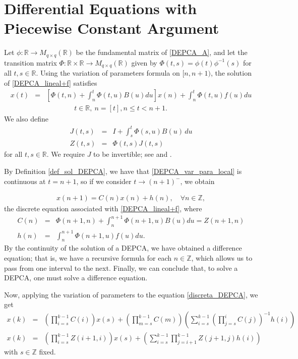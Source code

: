\documentclass[english,,reqno]{amsart}
\numberwithin{equation}{section}
\theoremstyle{plain}
\theoremstyle{definition}
\theoremstyle{remark}
\begin{document}
\section{Differential Equations with Piecewise Constant Argument}\label{sec3}

Let $\phi:\mathbb{R}\rightarrow M_{q\times q}(\mathbb{R})$ be the fundamental matrix of \eqref{DEPCA_A}, and let the transition matrix  $\Phi:\mathbb{R}\times \mathbb{R}\rightarrow M_{q\times q}(\mathbb{R})$ given by $\Phi(t,s) = \phi(t)\phi^{-1}(s)$ for all $t,s\in\mathbb{R}$.  Using the variation of parameters formula on $[n, n+1)$, the solution of \eqref{DEPCA_lineal+f} satisfies
\begin{eqnarray}
x(t)&=& \left[\Phi(t,n)+\int_{n}^{t}\Phi(t,u)B(u)du\right]x(n)+\int_{n}^{t}\Phi(t,u)f(u)du \label{DEPCA_var_para_local} \\
& & \ \ \ \ \ \ \ \ \ \ \ \ \ \ \ \ \ \ t\in \mathbb{R},\ n=[t], n\leq t< n+1. \nonumber
\end{eqnarray}
We also define  
\begin{eqnarray}
J(t,s) &=& I + \int_{s}^{t} \Phi(s,u) B(u)\,du \label{J_depca} \\
Z(t,s) &=& \Phi(t,s) J(t,s) \label{Z_depca}
\end{eqnarray}  
for all $t,s\in\mathbb{R}$. We require $J$ to be invertible; see \cite{cauchy,kuo} and \cite{robledo}.  

By Definition \ref{def_sol_DEPCA}, we have that \eqref{DEPCA_var_para_local} is continuous at $t = n+1$,  
so if we consider $t \to (n+1)^-$, we obtain

\begin{eqnarray}
x(n+1)=C(n)x(n)+h(n),\quad \forall n\in \mathbb{Z},\label{discreta_DEPCA}
\end{eqnarray}
the discrete equation associated with \eqref{DEPCA_lineal+f}, where
\begin{eqnarray}
C(n)&=& \Phi(n+1,n)+\int_{n}^{n+1}\Phi(n+1,u)B(u)du=Z(n+1,n) \label{C(n)} \\
h(n)&=& \int_{n}^{n+1}\Phi(n+1,u)f(u)du. \label{h(n)}
\end{eqnarray}
By the continuity of the solution of a DEPCA, we have obtained a difference equation; that is, we have a recursive formula for each $n \in \mathbb{Z}$,  
which allows us to pass from one interval to the next.  
Finally, we can conclude that, to solve a DEPCA, one must solve a difference equation.  

Now, applying the variation of parameters to the equation
\eqref{discreta_DEPCA}, we get
\begin{eqnarray}
x(k) & = & \left(\prod_{i=s}^{k-1}C(i)\right)x(s)+\left(\prod_{m=s}^{k-1}C(m)\right)\left(\sum_{i=s}^{k-1}\left(\prod_{j=s}^{i}C(j)\right)^{-1}h(i)\right)\nonumber \\
x(k) & = & \left(\prod_{i=s}^{k-1}Z(i+1,i)\right)x(s)+\left(\sum_{i=s}^{k-1}\prod_{j=i+1}^{k-1}Z(j+1,j)h(i)\right)\label{sol_discreta}
\end{eqnarray}
with $s\in\mathbb{Z}$ fixed.
\end{document}
